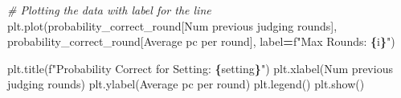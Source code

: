 \documentclass[
]{article}
\newenvironment{Shaded}{\begin{snugshade}}{\end{snugshade}}
\newcommand{\CommentTok}[1]{\textcolor[rgb]{0.56,0.35,0.01}{\textit{#1}}}
\newcommand{\NormalTok}[1]{#1}
\newcommand{\OperatorTok}[1]{\textcolor[rgb]{0.81,0.36,0.00}{\textbf{#1}}}
\newcommand{\SpecialCharTok}[1]{\textcolor[rgb]{0.81,0.36,0.00}{\textbf{#1}}}
\newcommand{\SpecialStringTok}[1]{\textcolor[rgb]{0.31,0.60,0.02}{#1}}
\newcommand{\StringTok}[1]{\textcolor[rgb]{0.31,0.60,0.02}{#1}}
\begin{document}
\begin{Shaded}
\begin{Highlighting}[]
      \CommentTok{\# Plotting the data with label for the line}
\NormalTok{      plt.plot(probability\_correct\_round[}\StringTok{\textquotesingle{}Num previous judging rounds\textquotesingle{}}\NormalTok{], probability\_correct\_round[}\StringTok{\textquotesingle{}Average pc per round\textquotesingle{}}\NormalTok{], label}\OperatorTok{=}\SpecialStringTok{f"Max Rounds: }\SpecialCharTok{\{}\NormalTok{i}\SpecialCharTok{\}}\SpecialStringTok{"}\NormalTok{)}
  
\NormalTok{  plt.title(}\SpecialStringTok{f"Probability Correct for Setting: }\SpecialCharTok{\{}\NormalTok{setting}\SpecialCharTok{\}}\SpecialStringTok{"}\NormalTok{) }
\NormalTok{  plt.xlabel(}\StringTok{\textquotesingle{}Num previous judging rounds\textquotesingle{}}\NormalTok{)}
\NormalTok{  plt.ylabel(}\StringTok{\textquotesingle{}Average pc per round\textquotesingle{}}\NormalTok{)}
\NormalTok{  plt.legend()}
\NormalTok{  plt.show()}
\end{Highlighting}
\end{Shaded}
\end{document}
